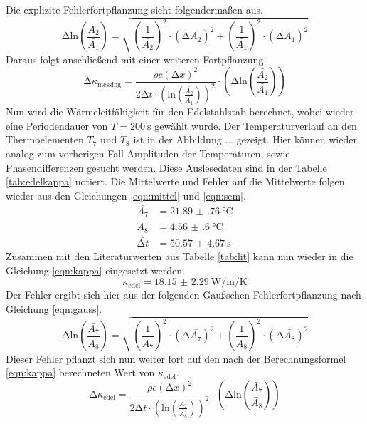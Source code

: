 Die explizite Fehlerfortpflanzung sieht folgendermaßen aus.
\begin{equation}
    \increment \text{ln} \left( \frac{\bar{A_{2}}}{\bar{A_{1}}}\right) = \sqrt{\left( \frac{1}{\bar{A_{2}}} \right)^{2}  \cdot (\increment \bar{A_{2}})^2 + \left( \frac{1}{\bar{A_{1}}}\right)^2 \cdot (\increment \bar{A_{1}})^2}
\end{equation}
Daraus folgt anschließend mit einer weiteren Fortpflanzung.
\begin{equation}
    \increment \kappa_{\text{messing}} = \frac{\rho c \left ( \increment x \right )^2}{2 \increment t \cdot \left(\text{ln} \left( \frac{\bar{A_{2}}}{\bar{A_{1}}}\right)\right)^2} \cdot \left(\increment \text{ln} \left( \frac{\bar{A_{2}}}{\bar{A_{1}}}\right)\right)
\end{equation}
Nun wird die Wärmeleitfähigkeit für den Edelstahlstab berechnet, wobei wieder eine Periodendauer von $T = \SI{200}{\second}$ gewählt wurde. Der Temperaturverlauf an den Thermoelementen 
$T_{7}$ und $T_{8}$ ist in der Abbildung ... gezeigt. Hier können wieder analog zum vorherigen Fall Amplituden der Temperaturen, sowie Phasendifferenzen gesucht werden. Diese Auslesedaten sind in der Tabelle
\ref{tab:edelkappa} notiert.
Die Mittelwerte und Fehler auf die Mittelwerte folgen wieder aus den Gleichungen \ref{eqn:mittel} und \ref{eqn:sem}.
\begin{align}
    \bar{A_{7}} &= \SI{21.89(76)}{\celsius}      \\
    \bar{A_{8}} &=  \SI{4.56(60)}{\celsius}        \\
    \bar{\increment t} &= \SI{50.57(467)}{\second}
\end{align}
Zusammen mit den Literaturwerten aus Tabelle \ref{tab:lit} kann nun wieder in die Gleichung \eqref{eqn:kappa} eingesetzt werden.
\begin{equation}
    \kappa_{\text{edel}} = \SI{18.15(229)}{\watt\per\meter\per\kelvin}
\end{equation}
Der Fehler ergibt sich hier aus der folgenden Gaußschen Fehlerfortpflanzung nach Gleichung \ref{eqn:gauss}.
\begin{equation}
 \increment \text{ln} \left( \frac{\bar{A_{7}}}{\bar{A_{8}}}\right) = \sqrt{\left( \frac{1}{\bar{A_{7}}} \right)^{2}  \cdot (\increment \bar{A_{7}})^2 + \left( \frac{1}{\bar{A_{8}}}\right)^2 \cdot (\increment \bar{A_{8}})^2}
\end{equation}
Dieser Fehler pflanzt sich nun weiter fort auf den nach der Berechnungsformel \eqref{eqn:kappa} berechneten Wert von $\kappa_{\text{edel}}$.
\begin{equation}
    \increment \kappa_{\text{edel}} = \frac{\rho c \left ( \increment x \right )^2}{2 \increment t \cdot \left(\text{ln} \left( \frac{\bar{A_{7}}}{\bar{A_{8}}}\right)\right)^2} \cdot \left(\increment \text{ln} \left( \frac{\bar{A_{7}}}{\bar{A_{8}}}\right)\right)
\end{equation}

